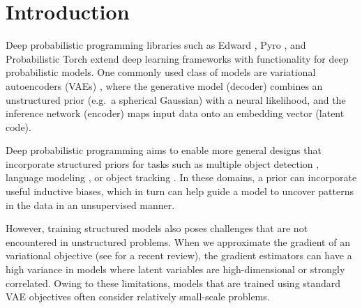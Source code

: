 \documentclass[anonymous=false, %
               format=acmsmall, %
               review=true, %
               screen=true, %
               nonacm=true]{acmart}
\theoremstyle{definition}
\begin{document}
\maketitle

\section{Introduction}

\label{introduction}

Deep probabilistic programming libraries such as Edward \cite{tran2016edward}, Pyro \cite{bingham2018pyro}, and Probabilistic Torch \cite{siddharth2017learning}  extend deep learning frameworks with functionality for deep probabilistic models. One commonly used class of models are 
variational autoencoders (VAEs) \cite{kingma2013auto-encoding, rezende2014stochastic}, where the generative model (decoder) combines an unstructured prior (e.g.~a spherical Gaussian) with a neural likelihood, and the inference network (encoder) maps input data onto an embedding vector (latent code).

Deep probabilistic programming aims to enable more general designs that incorporate structured priors for tasks such as multiple object detection \cite{eslami2016attend}, language modeling \cite{esmaeili2019structured}, or object tracking \cite{kosiorek2018sequential}. In these domains, a prior can incorporate useful inductive biases, which in turn can help guide a model to uncover patterns in the data in an unsupervised manner.


However, training structured models also poses challenges that are not encountered in unstructured problems. When we approximate the gradient of an variational objective (see \cite{mohamed2019monte} for a recent review),
the gradient estimators can have a high variance in models where latent variables are high-dimensional or strongly correlated. Owing to these limitations, models that are trained using standard VAE objectives often consider relatively small-scale problems.
\end{document}
